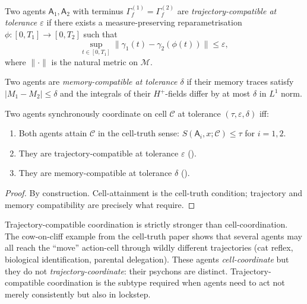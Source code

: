 \documentclass[11pt,twocolumn,a4paper]{article}
\newcommand{\M}{\mathcal{M}}
\newcommand{\Cell}{\mathcal{C}}
\newcommand{\agent}{\mathsf{A}}
\newcommand{\eps}{\varepsilon}
\newcommand{\norm}[1]{\lVert#1\rVert}
\newcommand{\abs}[1]{\lvert#1\rvert}
\begin{document}
\begin{definition}\label{def:traj-comp}
Two agents $\agent_1,\agent_2$ with terminus $\Gamma_f^{(1)}=\Gamma_f^{(2)}$
are \emph{trajectory-compatible at tolerance $\eps$} if there exists
a measure-preserving reparametrisation $\phi:[0,T_1]\to[0,T_2]$ such
that
\[
\sup_{t\in[0,T_1]}\norm{\gamma_1(t)-\gamma_2(\phi(t))}\le\eps,
\]
where $\norm{\cdot}$ is the natural metric on $\M$.
\end{definition}

\begin{definition}\label{def:mem-comp}
Two agents are \emph{memory-compatible at tolerance $\delta$} if their
memory traces satisfy $\abs{M_1-M_2}\le\delta$ and the integrals of
their $H^+$-fields differ by at most $\delta$ in $L^1$ norm.
\end{definition}

\begin{theorem}\label{thm:tcc}
Two agents synchronously coordinate on cell $\Cell$ at tolerance
$(\tau,\eps,\delta)$ iff:
\begin{enumerate}[label=(\arabic*),leftmargin=*]
\item Both agents attain $\Cell$ in the cell-truth sense:
$S(\agent_i,x;\Cell)\le\tau$ for $i=1,2$.
\item They are trajectory-compatible at tolerance $\eps$
().
\item They are memory-compatible at tolerance $\delta$
().
\end{enumerate}
\end{theorem}

\begin{proof}
By construction. Cell-attainment is the cell-truth condition;
trajectory and memory compatibility are precisely what
 require.
\end{proof}

\begin{remark}\label{rem:tcc-vs-cc}
Trajectory-compatible coordination is strictly stronger than
cell-coordination. The cow-on-cliff example from the cell-truth paper
shows that several agents may all reach the ``move'' action-cell
through wildly different trajectories (cat reflex, biological
identification, parental delegation). These agents \emph{cell-coordinate}
but they do not \emph{trajectory-coordinate}: their psychons are
distinct. Trajectory-compatible coordination is the subtype required
when agents need to act not merely consistently but also in lockstep.
\end{remark}
\end{document}
